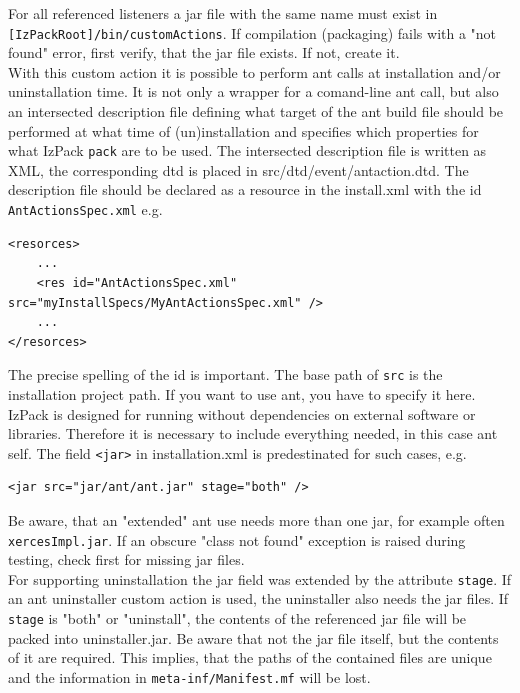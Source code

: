 For all referenced listeners a jar file with the same name must
exist in \texttt{[IzPackRoot]/bin/customActions}. If compilation
(packaging) fails with a "not found" error, first
verify, that the jar file exists. If not, create it.\\
With this custom action it is possible to perform ant calls at
installation and/or uninstallation time. It is not only a wrapper
for a comand-line ant call, but also an intersected description file
defining what target of the ant build file should be performed at
what time of (un)installation and specifies which properties for what IzPack
\texttt{pack} are to be used. The intersected description file is written as XML, 
the corresponding dtd is placed in
src/dtd/event/antaction.dtd. The description file should be declared as a
resource in the install.xml with the id \texttt{AntActionsSpec.xml} e.g.\\

\footnotesize
\begin{verbatim}
<resorces>
    ...
    <res id="AntActionsSpec.xml" src="myInstallSpecs/MyAntActionsSpec.xml" />
    ...
</resorces>
\end{verbatim}
\normalsize

The precise spelling of the id is important. The base path of \texttt{src}
is the installation project path. If you want to use ant, you have to specify it here. 
IzPack is designed for running without dependencies on external software or libraries.
Therefore it is necessary to include everything needed, in this case ant self. 
The field \texttt{<jar>} in
installation.xml is predestinated for such cases, e.g.\\
\begin{verbatim}
<jar src="jar/ant/ant.jar" stage="both" />
\end{verbatim}
\normalsize

Be aware, that an "extended" ant use needs more than one jar, for
example often \texttt{xercesImpl.jar}. If an obscure "class not
found" exception is raised during testing, check first for missing
jar files.\\
For supporting uninstallation the jar field was extended by the
attribute \texttt{stage}. If an ant uninstaller custom action is
used, the uninstaller also needs the jar files. If \texttt{stage}
is "both" or "uninstall", the contents of the referenced jar file
will be packed into uninstaller.jar. Be aware that not the jar file
itself, but the contents of it are required. This implies, that the paths of the
contained files are unique and the information in
\texttt{meta-inf/Manifest.mf} will be lost.\\
